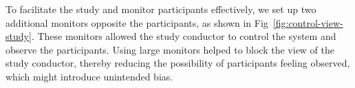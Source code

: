 To facilitate the study and monitor participants effectively, we set up two additional monitors opposite the participants, as shown in Fig~\ref{fig:control-view-study}. These monitors allowed the study conductor to control the system and observe the participants. Using large monitors helped to block the view of the study conductor, thereby reducing the possibility of participants feeling observed, which might introduce unintended bias.

\begin{invisBox}
	\hfill
\end{invisBox}

